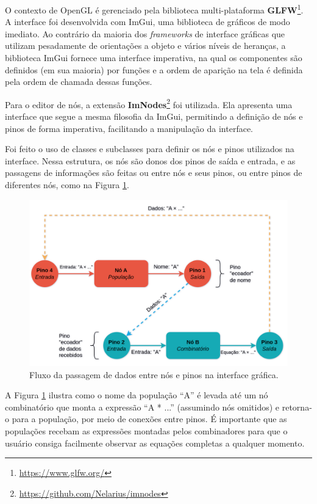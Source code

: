 \documentclass[
	12pt,				%
	openright,			%
	oneside,			%
	a4paper,			%
	main=brazil,
	english,			%
	]{ufsj-abntex2}
\begin{document}
O contexto de OpenGL é gerenciado pela biblioteca multi-plataforma \textbf{GLFW}\footnote{\href{https://www.glfw.org/}{https://www.glfw.org/}}. A interface foi desenvolvida com ImGui, uma biblioteca de gráficos de modo imediato. Ao contrário da maioria dos \textit{frameworks} de interface gráficas que utilizam pesadamente de orientações a objeto e vários níveis de heranças, a biblioteca ImGui fornece uma interface imperativa, na qual os componentes são definidos (em sua maioria) por funções e a ordem de aparição na tela é definida pela ordem de chamada dessas funções.

Para o editor de nós, a extensão \textbf{ImNodes}\footnote{\href{https://github.com/Nelarius/imnodes}{https://github.com/Nelarius/imnodes}} foi utilizada. Ela apresenta uma interface que segue a mesma filosofia da ImGui, permitindo a definição de nós e pinos de forma imperativa, facilitando a manipulação da interface.

Foi feito o uso de classes e subclasses para definir os nós e pinos utilizados na interface. Nessa estrutura, os nós são donos dos pinos de saída e entrada, e as passagens de informações são feitas ou entre nós e seus pinos, ou entre pinos de diferentes nós, como na Figura \ref{fig::fluxo_dados_gui}.

\begin{figure}[h]
    \centering
    \includegraphics[scale=0.175]{imgs/fluxo_dados_gui.png} 
    \caption{Fluxo da passagem de dados entre nós e pinos na interface gráfica.}
    \label{fig::fluxo_dados_gui}
\end{figure}

A Figura \ref{fig::fluxo_dados_gui} ilustra como o nome da população ``A'' é levada até um nó combinatório que monta a expressão ``A * ...'' (assumindo nós omitidos) e retorna-o para a população, por meio de conexões entre pinos. É importante que as populações recebam as expressões montadas pelos combinadores para que o usuário consiga facilmente observar as equações completas a qualquer momento.
\end{document}
